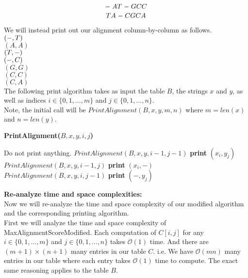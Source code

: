 \documentclass[12pt]{article}
\begin{document}
$$\relbar A T \relbar G C C$$
$$T A \relbar C G C A$$

We will instead print out our alignment column-by-column as follows. \\

$(\relbar, T)$ \\
$(A, A)$ \\
$(T, \relbar)$ \\
$(\relbar, C)$ \\
$(G, G)$ \\
$(C, C)$ \\
$(C, A)$ \\ 

The following print algorithm takes as input the table $B$, the strings $x$ and $y$, as well as indices $i \in \{0,1,...,m\}$ and $j \in \{0,1,...,n\}$. \\

Note, the initial call will be $PrintAlignment(B,x,y,m,n)$ where $m = len(x)$ and $n = len(y)$. \\

\begin{algorithm}[hbt!]
\caption{\textbf{PrintAlignment($B,x,y,i,j$)}}\label{alg:cap}

\begin{algorithmic}[1]
    \State Do not print anything.
\EndIf
\State
{}
    \State $PrintAlignment(B,x,y,i-1,j-1)$
    \State \textbf{print} $(x_i, y_j)$
    \State $PrintAlignment(B,x,y,i-1,j)$
    \State \textbf{print} $(x_i, -)$
    \State $PrintAlignment(B,x,y,i,j-1)$
    \State \textbf{print} $(-, y_j)$
\EndIf
\end{algorithmic}
\end{algorithm}

\newpage

\textbf{Re-analyze time and space complexities:} \\

Now we will re-analyze the time and space complexity of our modified algorithm and the corresponding printing algorithm. \\

First we will analyze the time and space complexity of MaxAlignmentScoreModified. Each computation of $C[i,j]$ for any $i \in \{0,1,...,m\}$ and $j \in \{0,1,...,n\}$ takes $\mathcal{O}(1)$ time. And there are $(m+1) \times (n+1)$ many entries in our table $C$. i.e. We have $\mathcal{O}(mn)$ many entries in our table where each entry takes $\mathcal{O}(1)$ time to compute. The exact same reasoning applies to the table $B$. \\
\end{document}
